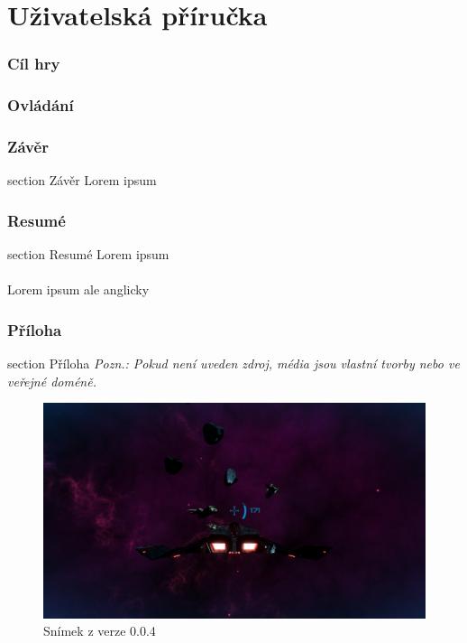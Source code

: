 \documentclass[12pt,a4paper,hidelinks]{article}
\begin{document}
\clearpage
\part{Uživatelská příručka}

\section{Cíl hry}

\section{Ovládání}

\clearpage
\section*{Závěr}
 {section} {Závěr}
Lorem ipsum

\clearpage

\section*{Resumé}
 {section} {Resumé}
Lorem ipsum\\
\\
Lorem ipsum ale anglicky\\


\clearpage

\section*{Příloha}
 {section} {Příloha}
\textit{Pozn.: Pokud není uveden zdroj, média jsou vlastní tvorby nebo ve veřejné doméně.}

\begin{figure}[h!]
	\centering
	\includegraphics[width=1.0\textwidth]{images/astra004_gameplay.png}
	\caption{Snímek z verze 0.0.4}
\end{figure}
\clearpage
\end{document}
